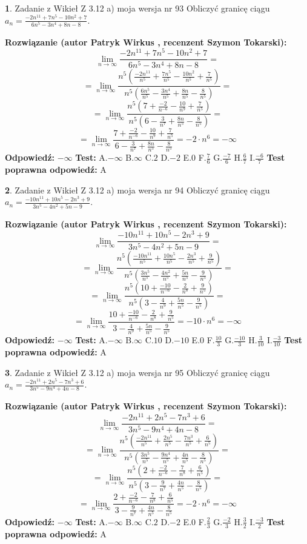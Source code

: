 \documentclass[12pt, a4paper]{article}
\theoremstyle{definition} %
\newtheorem{zad}{}
\newcommand{\zadStart}[1]{\begin{zad}#1\newline}
\newcommand{\zadStop}{\end{zad}}
\newcommand{\rozwStart}[2]{\noindent \textbf{Rozwiązanie (autor #1 , recenzent #2): }\newline}
\newcommand{\rozwStop}{\newline}
\newcommand{\odpStart}{\noindent \textbf{Odpowiedź:}\newline}
\newcommand{\odpStop}{\newline}
\newcommand{\testStart}{\noindent \textbf{Test:}\newline}
\newcommand{\testStop}{\newline}
\newcommand{\kluczStart}{\noindent \textbf{Test poprawna odpowiedź:}\newline}
\newcommand{\kluczStop}{\newline}
\begin{document}
\zadStart{Zadanie z Wikieł Z 3.12 a) moja wersja nr 93}
Obliczyć granicę ciągu $a_{n}=\frac{-2n^{11}+7n^{5}-10n^{2}+7}{6n^{5}-3n^{4}+8n-8}$.
\zadStop
\rozwStart{Patryk Wirkus}{Szymon Tokarski}
$$\lim\limits_{n\to\infty}\frac{-2n^{11}+7n^{5}-10n^{2}+7}{6n^{5}-3n^{4}+8n-8}=$$
$$=\lim\limits_{n\to\infty}\frac{n^{5}\left(\frac{-2n^{11}}{n^{5}}+\frac{7n^{5}}{n^{5}}-\frac{10n^{2}}{n^{5}}+\frac{7}{n^{5}}\right)}{n^{5}\left(\frac{6n^{5}}{n^{5}}-\frac{3n^{4}}{n^{5}}+\frac{8n}{n^{5}}-\frac{8}{n^{5}}\right)}=$$
$$=\lim\limits_{n\to\infty}\frac{n^{5}\left(7+\frac{-2}{n^{-6}}-\frac{10}{n^{9}}+\frac{7}{n^{5}}\right)}
{n^{5}\left(6-\frac{3}{n^{7}}+\frac{8n}{n^{5}}-\frac{8}{n^{5}}\right)}=$$
$$=\lim\limits_{n\to\infty}\frac{7+\frac{-2}{n^{-6}}-\frac{10}{n^{9}}+\frac{7}{n^{5}}}{6-\frac{3}{n^{7}}+\frac{8n}{n^{5}}-\frac{8}{n^{5}}}=-2\cdot n^{6} = -\infty$$
\rozwStop
\odpStart
$-\infty$
\odpStop
\testStart
A.$-\infty$
B.$\infty$
C.$2$
D.$-2$
E.$0$
F.$\frac{7}{6}$
G.$\frac{-7}{6}$
H.$\frac{6}{7}$
I.$\frac{-6}{7}$
\testStop
\kluczStart
A
\kluczStop



\zadStart{Zadanie z Wikieł Z 3.12 a) moja wersja nr 94}
Obliczyć granicę ciągu $a_{n}=\frac{-10n^{11}+10n^{5}-2n^{3}+9}{3n^{5}-4n^{2}+5n-9}$.
\zadStop
\rozwStart{Patryk Wirkus}{Szymon Tokarski}
$$\lim\limits_{n\to\infty}\frac{-10n^{11}+10n^{5}-2n^{3}+9}{3n^{5}-4n^{2}+5n-9}=$$
$$=\lim\limits_{n\to\infty}\frac{n^{5}\left(\frac{-10n^{11}}{n^{5}}+\frac{10n^{5}}{n^{5}}-\frac{2n^{3}}{n^{5}}+\frac{9}{n^{5}}\right)}{n^{5}\left(\frac{3n^{5}}{n^{5}}-\frac{4n^{2}}{n^{5}}+\frac{5n}{n^{5}}-\frac{9}{n^{5}}\right)}=$$
$$=\lim\limits_{n\to\infty}\frac{n^{5}\left(10+\frac{-10}{n^{-6}}-\frac{2}{n^{8}}+\frac{9}{n^{5}}\right)}
{n^{5}\left(3-\frac{4}{n^{9}}+\frac{5n}{n^{5}}-\frac{9}{n^{5}}\right)}=$$
$$=\lim\limits_{n\to\infty}\frac{10+\frac{-10}{n^{-6}}-\frac{2}{n^{8}}+\frac{9}{n^{5}}}{3-\frac{4}{n^{9}}+\frac{5n}{n^{5}}-\frac{9}{n^{5}}}=-10\cdot n^{6} = -\infty$$
\rozwStop
\odpStart
$-\infty$
\odpStop
\testStart
A.$-\infty$
B.$\infty$
C.$10$
D.$-10$
E.$0$
F.$\frac{10}{3}$
G.$\frac{-10}{3}$
H.$\frac{3}{10}$
I.$\frac{-3}{10}$
\testStop
\kluczStart
A
\kluczStop



\zadStart{Zadanie z Wikieł Z 3.12 a) moja wersja nr 95}
Obliczyć granicę ciągu $a_{n}=\frac{-2n^{11}+2n^{5}-7n^{3}+6}{3n^{5}-9n^{4}+4n-8}$.
\zadStop
\rozwStart{Patryk Wirkus}{Szymon Tokarski}
$$\lim\limits_{n\to\infty}\frac{-2n^{11}+2n^{5}-7n^{3}+6}{3n^{5}-9n^{4}+4n-8}=$$
$$=\lim\limits_{n\to\infty}\frac{n^{5}\left(\frac{-2n^{11}}{n^{5}}+\frac{2n^{5}}{n^{5}}-\frac{7n^{3}}{n^{5}}+\frac{6}{n^{5}}\right)}{n^{5}\left(\frac{3n^{5}}{n^{5}}-\frac{9n^{4}}{n^{5}}+\frac{4n}{n^{5}}-\frac{8}{n^{5}}\right)}=$$
$$=\lim\limits_{n\to\infty}\frac{n^{5}\left(2+\frac{-2}{n^{-6}}-\frac{7}{n^{8}}+\frac{6}{n^{5}}\right)}
{n^{5}\left(3-\frac{9}{n^{7}}+\frac{4n}{n^{5}}-\frac{8}{n^{5}}\right)}=$$
$$=\lim\limits_{n\to\infty}\frac{2+\frac{-2}{n^{-6}}-\frac{7}{n^{8}}+\frac{6}{n^{5}}}{3-\frac{9}{n^{7}}+\frac{4n}{n^{5}}-\frac{8}{n^{5}}}=-2\cdot n^{6} = -\infty$$
\rozwStop
\odpStart
$-\infty$
\odpStop
\testStart
A.$-\infty$
B.$\infty$
C.$2$
D.$-2$
E.$0$
F.$\frac{2}{3}$
G.$\frac{-2}{3}$
H.$\frac{3}{2}$
I.$\frac{-3}{2}$
\testStop
\kluczStart
A
\kluczStop
\end{document}
